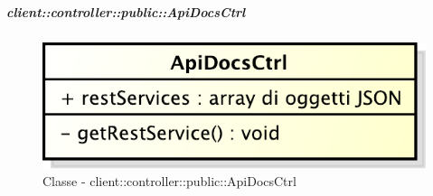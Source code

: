 		\subparagraph{client::controller::public::ApiDocsCtrl} %
		\label{subp:bdsm_app_client_controller_public_apidocsctrl}
			\begin{figure}[htbp]
				\centering
				\centerline{\includegraphics[scale=0.7]{./images/client/classes/controller/api_docs_ctrl.pdf}}
				\caption{Classe - client::controller::public::ApiDocsCtrl}
			\end{figure}
